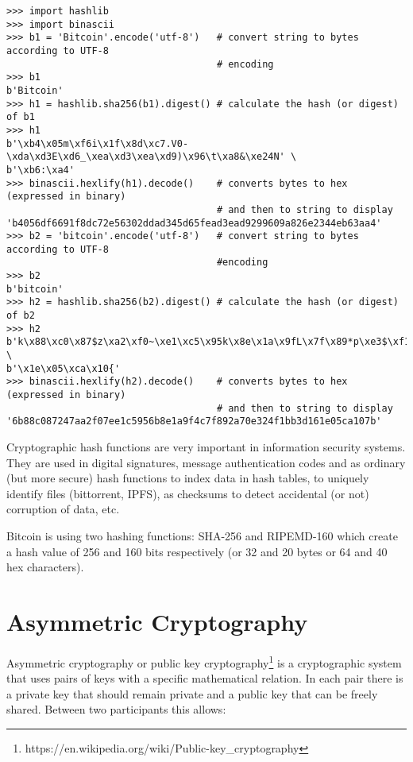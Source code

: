\vspace{1em}
\begin{lstlisting}[style=Python,label={lst:encodings-4},caption={Python examples},captionpos=b]
>>> import hashlib
>>> import binascii
>>> b1 = 'Bitcoin'.encode('utf-8')   # convert string to bytes according to UTF-8 
                                     # encoding
>>> b1
b'Bitcoin'
>>> h1 = hashlib.sha256(b1).digest() # calculate the hash (or digest) of b1
>>> h1
b'\xb4\x05m\xf6i\x1f\x8d\xc7.V0-\xda\xd3E\xd6_\xea\xd3\xea\xd9)\x96\t\xa8&\xe24N' \
b'\xb6:\xa4'
>>> binascii.hexlify(h1).decode()    # converts bytes to hex (expressed in binary)
                                     # and then to string to display
'b4056df6691f8dc72e56302ddad345d65fead3ead9299609a826e2344eb63aa4'
>>> b2 = 'bitcoin'.encode('utf-8')   # convert string to bytes according to UTF-8
                                     #encoding
>>> b2
b'bitcoin'
>>> h2 = hashlib.sha256(b2).digest() # calculate the hash (or digest) of b2
>>> h2
b'k\x88\xc0\x87$z\xa2\xf0~\xe1\xc5\x95k\x8e\x1a\x9fL\x7f\x89*p\xe3$\xf1\xbb=\x16' \
b'\x1e\x05\xca\x10{'
>>> binascii.hexlify(h2).decode()    # converts bytes to hex (expressed in binary)
                                     # and then to string to display
'6b88c087247aa2f07ee1c5956b8e1a9f4c7f892a70e324f1bb3d161e05ca107b'
\end{lstlisting}
\vspace{1em}

Cryptographic hash functions are very important in information security systems. They are used in digital signatures, message authentication codes and as ordinary (but more secure) hash functions to index data in hash tables, to uniquely identify files (bittorrent, IPFS), as checksums to detect accidental (or not) corruption of data, etc.

\begin{note}
Bitcoin is using two hashing functions: SHA-256 and RIPEMD-160 which create a hash value of 256 and 160 bits respectively (or 32 and 20 bytes or 64 and 40 hex characters).
\end{note}

\section{Asymmetric Cryptography}
Asymmetric cryptography or public key cryptography\footnote{https://en.wikipedia.org/wiki/Public-key\_cryptography} is a cryptographic system that uses pairs of keys with a specific mathematical relation. In each pair there is a private key that should remain private and a public key that can be freely shared. Between two participants this allows:

